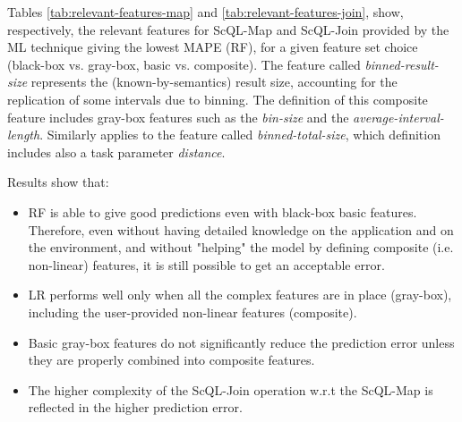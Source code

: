 \documentclass[a4paper, 10pt, conference]{ieeeconf}      %
\begin{document}
\noindent Tables \ref{tab:relevant-features-map} and  \ref{tab:relevant-features-join}, show, respectively, the relevant features for ScQL-Map and ScQL-Join provided by the ML technique giving the lowest MAPE (RF), for a given feature set choice (black-box vs. gray-box, basic vs. composite).
The feature called \textit{binned-result-size} represents the (known-by-semantics) result size, accounting for the replication of some intervals due to binning. The definition of this composite feature includes gray-box features such as the \textit{bin-size} and the \textit{average-interval-length}.
Similarly applies to the feature called \textit{binned-total-size}, which definition includes also a task parameter \textit{distance}.

\noindent Results show that:
\begin{itemize}
    \item RF is able to give good predictions even with black-box basic features. Therefore,  even without having detailed knowledge on the application and on the environment, and without "helping" the model by defining composite (i.e. non-linear) features, it is still possible to get an acceptable error. 
    \item LR performs well only when all the complex  features are in place (gray-box), including the user-provided non-linear features (composite). 
    \item Basic gray-box features do not significantly reduce the prediction error unless they are properly combined into composite features. 
    \item The higher complexity of the ScQL-Join operation w.r.t the ScQL-Map is reflected in the higher prediction error.
    \color{black}
    \color{black}
\end{itemize}
\end{document}
